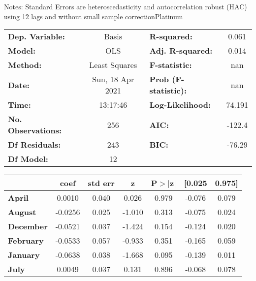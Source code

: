 Notes: \newline
 [1] Standard Errors are heteroscedasticity and autocorrelation robust (HAC) using 12 lags and without small sample correctionPlatinum\begin{center}
\begin{tabular}{lclc}
\toprule
\textbf{Dep. Variable:}    &      Basis       & \textbf{  R-squared:         } &     0.061   \\
\textbf{Model:}            &       OLS        & \textbf{  Adj. R-squared:    } &     0.014   \\
\textbf{Method:}           &  Least Squares   & \textbf{  F-statistic:       } &       nan   \\
\textbf{Date:}             & Sun, 18 Apr 2021 & \textbf{  Prob (F-statistic):} &      nan    \\
\textbf{Time:}             &     13:17:46     & \textbf{  Log-Likelihood:    } &    74.191   \\
\textbf{No. Observations:} &         256      & \textbf{  AIC:               } &    -122.4   \\
\textbf{Df Residuals:}     &         243      & \textbf{  BIC:               } &    -76.29   \\
\textbf{Df Model:}         &          12      & \textbf{                     } &             \\
\bottomrule
\end{tabular}
\begin{tabular}{lcccccc}
                   & \textbf{coef} & \textbf{std err} & \textbf{z} & \textbf{P$> |$z$|$} & \textbf{[0.025} & \textbf{0.975]}  \\
\midrule
\textbf{April}     &       0.0010  &        0.040     &     0.026  &         0.979        &       -0.076    &        0.079     \\
\textbf{August}    &      -0.0256  &        0.025     &    -1.010  &         0.313        &       -0.075    &        0.024     \\
\textbf{December}  &      -0.0521  &        0.037     &    -1.424  &         0.154        &       -0.124    &        0.020     \\
\textbf{February}  &      -0.0533  &        0.057     &    -0.933  &         0.351        &       -0.165    &        0.059     \\
\textbf{January}   &      -0.0638  &        0.038     &    -1.668  &         0.095        &       -0.139    &        0.011     \\
\textbf{July}      &       0.0049  &        0.037     &     0.131  &         0.896        &       -0.068    &        0.078     \\

\end{tabular}
\end{center}
